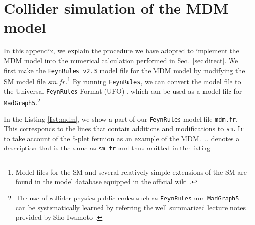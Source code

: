 \documentclass[12pt,twoside,book]{article}
\begin{document}
\section{Collider simulation of the MDM model}
\label{sec:feynrules}

\vskip 0.1in

In this appendix, we explain the procedure we have adopted to implement the MDM model into the numerical calculation performed in Sec.~\ref{sec:direct}.
We first make the \texttt{FeynRules v2.3} \cite{Alloul:2013bka} model file for the MDM model by modifying the SM model file $sm.fr$.\footnote{
  Model files for the SM and several relatively simple extensions of the SM are found in the model database equipped in the official wiki \cite{Alloul:wiki}.
}
By running \texttt{FeynRules}, we can convert the model file to the Universal \texttt{FeynRules} Format (UFO) \cite{Degrande:2011ua}, which can be used as a model file for \texttt{MadGraph5}.\footnote{
  The use of collider physics public codes such as \texttt{FeynRules} and \texttt{MadGraph5} can be systematically learned by referring the well summarized lecture notes provided by Sho Iwamoto \cite{Iwamoto:FeynLecture}.
}

In the Listing \ref{list:mdm}, we show a part of our \texttt{FeynRules} model file \texttt{mdm.fr}.
This corresponds to the lines that contain additions and modifications to \texttt{sm.fr} to take account of the $5$-plet fermion as an example of the MDM.
$\dots$ denotes a description that is the same as \texttt{sm.fr} and thus omitted in the listing.
\end{document}
